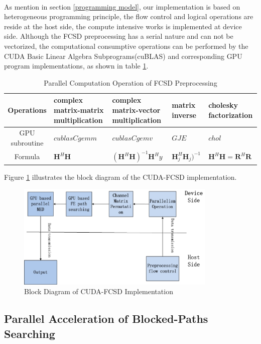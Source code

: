 \documentclass[12pt,a4paper,final]{article}
\begin{document}
\begin{spacing}{2.5}
\paragraph{}As mention in section \ref{programming model}, our implementation is based on heterogeneous programming principle, the flow control and logical operations are reside at the host side, the compute intensive works is implemented at device side. Although the FCSD preprocessing has a serial nature and can not be vectorized, the computational consumptive operations can be performed by the CUDA Basic Linear Algebra Subprograms(cuBLAS) and corresponding GPU program implementations, as shown in table \ref{table1}.
\begin{table}[htb]
\centering
\begin{tabular}{|c|p{3cm}|p{3cm}|p{3cm}|p{3cm}|}
\hline
Operations & complex matrix-matrix multiplication & complex matrix-vector multiplication & matrix inverse & cholesky factorization \\
\hline
GPU subroutine & $\mathit{cublasCgemm}$  & $\mathit{cublasCgemv}$ & $\mathit{GJE}$ & $\mathit{chol}$\\
\hline
Formula   &  $\mathbf{H}^{H}\mathbf{H}$ & $(\mathbf{H}^{H}\mathbf{H})^{-1}\mathbf{H}^{H}y$ & $\mathbf{H}_{j}^{H}\mathbf{H}_{j})^{-1} $ & $\mathbf{H}^{H}\mathbf{H}=\mathbf{R}^{H}\mathbf{R}$ 
\\
\hline
\end{tabular}
\caption{Parallel Computation Operation of FCSD Preprocessing}
\label{table1}
\end{table}

Figure \ref{block diagram} illustrates the block diagram of the CUDA-FCSD implementation. 
\begin{figure}[htb]
\centering
\includegraphics[width=0.85\textwidth]{CUDA_FCSD_block_diagram.eps}
\caption{Block Diagram of CUDA-FCSD Implementation}
\label{block diagram}
\end{figure}
\subsection{Parallel Acceleration of Blocked-Paths Searching}

\end{spacing}
\end{document}

